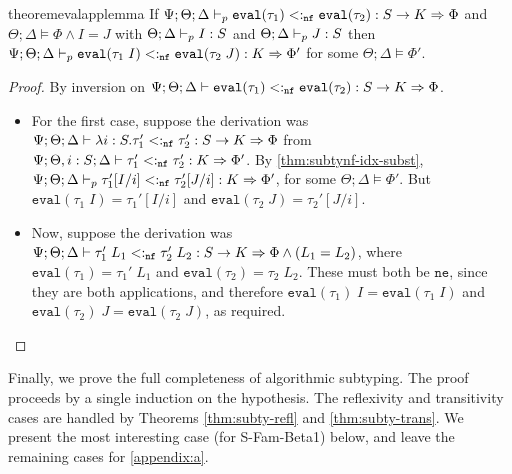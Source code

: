\begin{restatable}{theorem}{evalapplemma}
If $\Psi ; \Theta ; \Delta \vdash_p \texttt{eval}(\tau_1) <:_{\texttt{nf}} \texttt{eval}(\tau_2) : S \to K \Rightarrow \Phi$ and $\Theta ; \Delta \vDash \Phi \wedge I = J$ with $\Theta ; \Delta \vdash_p I : S$ and $\Theta ; \Delta \vdash_p J : S$ then 
$\Psi ; \Theta ; \Delta \vdash_p \texttt{eval}(\tau_1 \; I) <:_{\texttt{nf}} \texttt{eval}(\tau_2 \; J) : K \Rightarrow \Phi'$ for some $\Theta ; \Delta \vDash \Phi'$.
\label{thm:eval-app-lemma}
\end{restatable}
\begin{proof}
By inversion on $\Psi ; \Theta ; \Delta \vdash \texttt{eval}(\tau_1) <:_{\texttt{nf}} \texttt{eval}(\tau_2) : S \to K \Rightarrow \Phi$.
\begin{itemize}
  \item For the first case, suppose the derivation was $\Psi ; \Theta ; \Delta \vdash \lambda i : S. \tau_1' <:_{\texttt{nf}} \tau_2' : S \to K \Rightarrow \Phi$
  from $\Psi ; \Theta, i : S ; \Delta \vdash \tau_1' <:_{\texttt{nf}} \tau_2' : K \Rightarrow \Phi'$. By \autoref{thm:subtynf-idx-subst},
  $\Psi ; \Theta ; \Delta \vdash_p \tau_1'[I/i] <:_{\texttt{nf}} \tau_2'[J/i] : K \Rightarrow \Phi'$, for some $\Theta ; \Delta \vDash \Phi'$. But $\texttt{eval}(\tau_1 \; I) = \tau_1'[I/i]$ and $\texttt{eval}(\tau_2 \; J) = \tau_2'[J/i]$.
  \item Now, suppose the derivation was $\Psi ; \Theta ; \Delta \vdash \tau_1' \; L_1 <:_{\texttt{nf}} \tau_2' \; L_2 : S \to K \Rightarrow \Phi \wedge (L_1 = L_2)$, where $\texttt{eval}(\tau_1) = \tau_1' \; L_1$ and $\texttt{eval}(\tau_2) = \tau_2 \; L_2$. These must both be $\texttt{ne}$, since they are both applications, and therefore
  $\texttt{eval}(\tau_1) \; I = \texttt{eval}(\tau_1 \; I)$ and $\texttt{eval}(\tau_2) \; J = \texttt{eval}(\tau_2 \; J)$, as required.
\end{itemize}
\end{proof}

Finally, we prove the full completeness of algorithmic subtyping. The proof proceeds by a single induction on the hypothesis. The reflexivity and transitivity cases are handled by Theorems \ref{thm:subty-refl} and \ref{thm:subty-trans}. We present the most interesting case (for S-Fam-Beta1) below, and leave the remaining cases for \autoref{appendix:a}.

